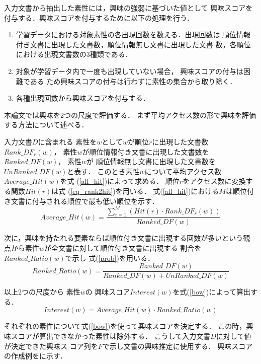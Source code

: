 \documentclass[japanese]{jnlp_1.4}
\newcounter{ex}
\def\exref#1{}
\begin{document}
入力文書から抽出した素性には，興味の強弱に基づいた値として
興味スコアを付与する．興味スコアを付与するために以下の処理を行う．

\begin{enumerate}
 \item 学習データにおける対象素性の各出現回数を数える．出現回数は
       順位情報付き文書に出現した文書数，順位情報無し文書に出現した文書
       数，各順位における出現文書数の3種類である．       
 \item 対象が学習データ内で一度も出現していない場合，
       興味スコアの付与は困難である
       ため興味スコアの付与は行わずに素性の集合から取り除く．
 \item 各種出現回数から興味スコアを付与する．
\end{enumerate}

本論文では興味を2つの尺度で評価する．
まず平均アクセス数の形で興味を評価する方法について述べる．

入力文書$D$に含まれる
素性を$w$として$w$が順位$r$に出現した文書数$Rank\_DF_{r}(w)$，
素性$w$が順位情報付き文書に出現した文書数を$Ranked\_DF(w)$，
素性$w$が
順位情報無し文書に出現した文書数を$UnRanked\_DF(w)$と表す．
このとき素性$w$について平均アクセス数$Average\_Hit(w)$を式
(\ref{all_hit})によって求める．
順位$r$をアクセス数に変換する関数$Hit(r)$は式
(\ref{eq_rank2hit})を用いる．
式(\ref{all_hit})における$M$は順位付き文書に付与される順位で最も低い順位を示す．
\begin{equation} \label{all_hit}
 Average\_Hit(w) = \frac {\sum_{r=1}^{M}(Hit(r) \cdot Rank\_DF_{r}(w))} {Ranked\_DF(w)}
\end{equation}

次に，興味を持たれる要素ならば順位付き文書に出現する回数が多いという観
点から素性$w$が全文書に対して順位付き文書に出現する
割合を$Ranked\_Ratio(w)$で示し
式(\ref{prob})を用いる．
\begin{equation} \label{prob}
 Ranked\_Ratio(w) 
	= \frac{Ranked\_DF(w)}{Ranked\_DF(w)+UnRanked\_DF(w)}
\end{equation}

以上2つの尺度から
素性$w$の
興味スコア$Interest(w)$を式(\ref{bow})によって算出する．
\begin{equation} \label{bow}
 Interest(w) 
	=  Average\_Hit(w) \cdot Ranked\_Ratio(w)
\end{equation}

それぞれの素性について式(\ref{bow})を使って興味スコアを決定する．
この時，興味スコアが算出できなかった素性は除外する．
こうして入力文書$D$に対して値が決定できた興味ス
コア列を$F$で示し文書の興味推定に使用する．
興味スコアの作成例を\exref{chasenex2}に示す．
\end{document}
